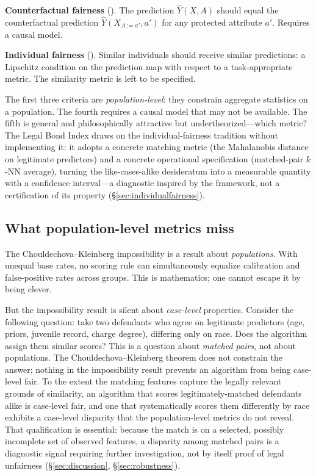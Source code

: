 \documentclass[11pt]{article}
\begin{document}
\textbf{Counterfactual fairness} (\citealp{kusner2017}). The
prediction $\hat{Y}(X, A)$ should equal the counterfactual prediction
$\hat{Y}(X_{A := a'}, a')$ for any protected attribute $a'$. Requires
a causal model.

\textbf{Individual fairness} (\citealp{dwork2012}). Similar
individuals should receive similar predictions: a Lipschitz condition
on the prediction map with respect to a task-appropriate metric. The
similarity metric is left to be specified.

The first three criteria are \emph{population-level}: they constrain
aggregate statistics on a population. The fourth requires a causal
model that may not be available. The fifth is general and
philosophically attractive but undertheorized---which metric? The
Legal Bond Index draws on the individual-fairness tradition without
implementing it: it adopts a concrete matching metric (the Mahalanobis
distance on legitimate predictors) and a concrete operational
specification (matched-pair $k$-NN average), turning the
like-cases-alike desideratum into a measurable quantity with a
confidence interval---a diagnostic inspired by the framework, not a
certification of its property (\S\ref{sec:individualfairness}).

\subsection{What population-level metrics miss}

The Chouldechova--Kleinberg impossibility is a result about
\emph{populations}. With unequal base rates, no scoring rule can
simultaneously equalize calibration and false-positive rates across
groups. This is mathematics; one cannot escape it by being clever.

But the impossibility result is silent about \emph{case-level}
properties. Consider the following question: take two defendants who
agree on legitimate predictors (age, priors, juvenile record, charge
degree), differing only on race. Does the algorithm assign them
similar scores? This is a question about \emph{matched pairs}, not
about populations. The Chouldechova--Kleinberg theorem does not
constrain the answer; nothing in the impossibility result prevents
an algorithm from being case-level fair. To the extent the matching features capture the legally relevant grounds
of similarity, an algorithm that scores legitimately-matched defendants
alike is case-level fair, and one that systematically scores them
differently by race exhibits a case-level disparity that the
population-level metrics do not reveal. That qualification is essential:
because the match is on a selected, possibly incomplete set of observed
features, a disparity among matched pairs is a diagnostic signal
requiring further investigation, not by itself proof of legal unfairness
(\S\ref{sec:discussion}, \S\ref{sec:robustness}).
\end{document}

